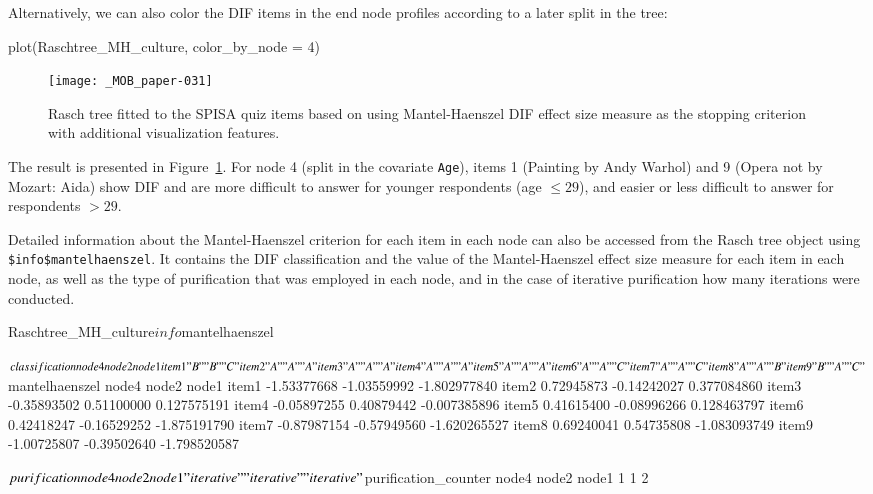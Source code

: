 \documentclass[doc,floatsintext,natbib]{apa7}
\begin{document}

Alternatively, we can also color the DIF items in the end node profiles according to a later split in the tree:

\begin{Schunk}
\begin{Sinput}
 plot(Raschtree_MH_culture, color_by_node = 4)
\end{Sinput}
\end{Schunk}


\begin{figure}%
\caption{Rasch tree fitted to the SPISA quiz items based on using Mantel-Haenszel DIF effect size measure as the stopping criterion with additional visualization features.}
\texttt{[image: \_MOB\_paper-031]}
\label{fig:MHtree4}
\end{figure}%

The result is presented in Figure~\ref{fig:MHtree4}. For node 4 (split in the covariate \texttt{Age}), items 1 (Painting by Andy Warhol) and 9 (Opera not by Mozart: Aida) show DIF and are %
more difficult to answer for younger respondents (age $\leq 29$), and easier or less difficult to answer for respondents $>29$.

Detailed information about the Mantel-Haenszel criterion for each item in each node can also be accessed from the Rasch tree object using \texttt{\$info\$mantelhaenszel}. It contains the DIF classification and the value of the Mantel-Haenszel effect size measure for each item in each node, as well as the type of purification that was employed in each node, and in the case of iterative purification how many iterations were conducted.

\begin{Schunk}
\begin{Sinput}
 Raschtree_MH_culture$info$mantelhaenszel
\end{Sinput}
\begin{Soutput}
$classification
      node4 node2 node1
item1 "B"   "B"   "C"  
item2 "A"   "A"   "A"  
item3 "A"   "A"   "A"  
item4 "A"   "A"   "A"  
item5 "A"   "A"   "A"  
item6 "A"   "A"   "C"  
item7 "A"   "A"   "C"  
item8 "A"   "A"   "B"  
item9 "B"   "A"   "C"  

$mantelhaenszel
            node4       node2        node1
item1 -1.53377668 -1.03559992 -1.802977840
item2  0.72945873 -0.14242027  0.377084860
item3 -0.35893502  0.51100000  0.127575191
item4 -0.05897255  0.40879442 -0.007385896
item5  0.41615400 -0.08996266  0.128463797
item6  0.42418247 -0.16529252 -1.875191790
item7 -0.87987154 -0.57949560 -1.620265527
item8  0.69240041  0.54735808 -1.083093749
item9 -1.00725807 -0.39502640 -1.798520587

$purification
      node4       node2       node1 
"iterative" "iterative" "iterative" 

$purification_counter
node4 node2 node1 
    1     1     2 
\end{Soutput}
\end{Schunk}
\end{document}
